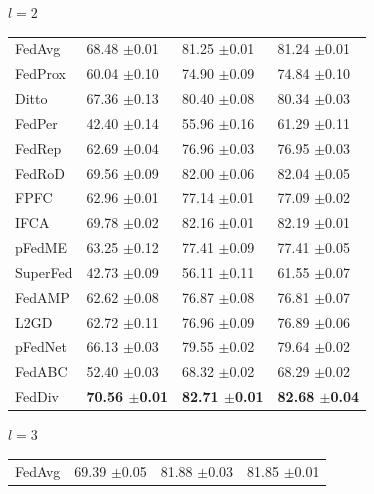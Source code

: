 \documentclass[journal]{IEEEtran}
\begin{document}
\begin{table}
	\begin{subtable}[]{$l=2$}
		\begin{tabular}{@{}llll@{}}
			\specialrule{0em}{3pt}{1pt}
			\toprule
			FedAvg   & 68.48 $\pm$0.01          & 81.25 $\pm$0.01          & 81.24 $\pm$0.01          \\
			FedProx  & 60.04 $\pm$0.10          & 74.90 $\pm$0.09          & 74.84 $\pm$0.10          \\
			Ditto    & 67.36 $\pm$0.13          & 80.40 $\pm$0.08          & 80.34 $\pm$0.03          \\
			FedPer   & 42.40 $\pm$0.14          & 55.96 $\pm$0.16          & 61.29 $\pm$0.11          \\
			FedRep   & 62.69 $\pm$0.04          & 76.96 $\pm$0.03          & 76.95 $\pm$0.03          \\
			FedRoD   & 69.56 $\pm$0.09          & 82.00 $\pm$0.06          & 82.04 $\pm$0.05          \\
			FPFC     & 62.96 $\pm$0.01          & 77.14 $\pm$0.01          & 77.09 $\pm$0.02          \\
			IFCA     & 69.78 $\pm$0.02          & 82.16 $\pm$0.01          & 82.19 $\pm$0.01          \\
			pFedME   & 63.25 $\pm$0.12          & 77.41 $\pm$0.09          & 77.41 $\pm$0.05          \\
			SuperFed & 42.73 $\pm$0.09          & 56.11 $\pm$0.11          & 61.55 $\pm$0.07          \\
			FedAMP   & 62.62 $\pm$0.08          & 76.87 $\pm$0.08          & 76.81 $\pm$0.07          \\
			L2GD   & 62.72 $\pm$0.11          & 76.96 $\pm$0.09          & 76.89 $\pm$0.06          \\
			pFedNet  & 66.13 $\pm$0.03          & 79.55 $\pm$0.02          & 79.64 $\pm$0.02          \\
			FedABC   & 52.40 $\pm$0.03          & 68.32 $\pm$0.02          & 68.29 $\pm$0.02          \\
			FedDiv   & \textbf{70.56 $\pm$0.01} & \textbf{82.71 $\pm$0.01} & \textbf{82.68 $\pm$0.04} \\ \bottomrule
		\end{tabular}
	\end{subtable}
	\centering
	\begin{subtable}[]{$l=3$}
		\begin{tabular}{@{}llll@{}}
			\specialrule{0em}{3pt}{1pt}
			\toprule
			FedAvg   & 69.39 $\pm$0.05          & 81.88 $\pm$0.03          & 81.85 $\pm$0.01          \\

\end{tabular}
\end{subtable}
\end{table}
\end{document}
